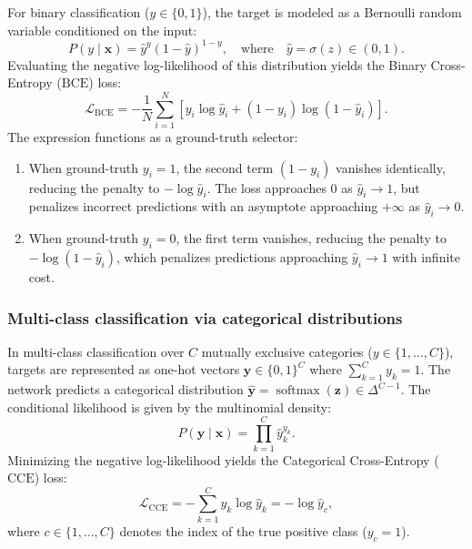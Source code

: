 \documentclass[../../../main.tex]{subfiles}
\begin{document}
For binary classification ($y \in \{0, 1\}$), the target is modeled as a Bernoulli random variable conditioned on the input:
\begin{equation}
P(y \mid \mathbf{x}) = \hat{y}^y \left( 1 - \hat{y} \right)^{1 - y}, \quad \text{where} \quad \hat{y} = \sigma(z) \in (0, 1).
\end{equation}
Evaluating the negative log-likelihood of this distribution yields the Binary Cross-Entropy ($\text{BCE}$) loss:
\begin{equation}
\mathcal{L}_{\text{BCE}} = -\frac{1}{N} \sum_{i=1}^N \left[ y_i \log \hat{y}_i + (1 - y_i) \log(1 - \hat{y}_i) \right].
\end{equation}
The expression functions as a ground-truth selector:
\begin{enumerate}[label=(\roman*)]
    \item When ground-truth $y_i = 1$, the second term $(1 - y_i)$ vanishes identically, reducing the penalty to $-\log \hat{y}_i$. The loss approaches $0$ as $\hat{y}_i \to 1$, but penalizes incorrect predictions with an asymptote approaching $+\infty$ as $\hat{y}_i \to 0$.
    \item When ground-truth $y_i = 0$, the first term vanishes, reducing the penalty to $-\log(1 - \hat{y}_i)$, which penalizes predictions approaching $\hat{y}_i \to 1$ with infinite cost.
\end{enumerate}

\subsubsection{Multi-class classification via categorical distributions}

In multi-class classification over $C$ mutually exclusive categories ($y \in \{1, \dots, C\}$), targets are represented as one-hot vectors $\mathbf{y} \in \{0, 1\}^C$ where $\sum_{k=1}^C y_k = 1$. The network predicts a categorical distribution $\hat{\mathbf{y}} = \operatorname{softmax}(\mathbf{z}) \in \Delta^{C-1}$. The conditional likelihood is given by the multinomial density:
\begin{equation}
P(\mathbf{y} \mid \mathbf{x}) = \prod_{k=1}^C \hat{y}_k^{y_k}.
\end{equation}
Minimizing the negative log-likelihood yields the Categorical Cross-Entropy ($\text{CCE}$) loss:
\begin{equation}
\mathcal{L}_{\text{CCE}} = -\sum_{k=1}^C y_k \log \hat{y}_k = -\log \hat{y}_c,
\end{equation}
where $c \in \{1, \dots, C\}$ denotes the index of the true positive class ($y_c = 1$).
\end{document}
